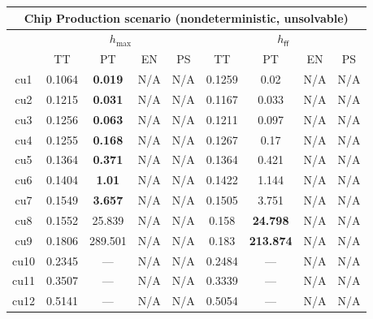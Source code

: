 \documentclass[landscape]{article}%
\begin{document}
%
\normalsize%
\begin{tabular}{||c||c|c|c|c|c|c|c|c||}%
\multicolumn{9}{c}{\textbf{Chip Production scenario (nondeterministic, unsolvable)}}\\%
\hline%
&\multicolumn{4}{||c||}{$h_{\max}$}&\multicolumn{4}{||c||}{$h_{\mathsf{ff}}$}\\%
\hline%
&\small{TT}&\small{PT}&\small{EN}&\small{PS}&\small{TT}&\small{PT}&\small{EN}&\small{PS}\\%
\hline%
\hline%
cu1&\small{0.1064}&\small{\textbf{0.019}}&\small{N/A}&\small{N/A}&\small{0.1259}&\small{0.02}&\small{N/A}&\small{N/A}\\%
\hline%
cu2&\small{0.1215}&\small{\textbf{0.031}}&\small{N/A}&\small{N/A}&\small{0.1167}&\small{0.033}&\small{N/A}&\small{N/A}\\%
\hline%
cu3&\small{0.1256}&\small{\textbf{0.063}}&\small{N/A}&\small{N/A}&\small{0.1211}&\small{0.097}&\small{N/A}&\small{N/A}\\%
\hline%
cu4&\small{0.1255}&\small{\textbf{0.168}}&\small{N/A}&\small{N/A}&\small{0.1267}&\small{0.17}&\small{N/A}&\small{N/A}\\%
\hline%
cu5&\small{0.1364}&\small{\textbf{0.371}}&\small{N/A}&\small{N/A}&\small{0.1364}&\small{0.421}&\small{N/A}&\small{N/A}\\%
\hline%
cu6&\small{0.1404}&\small{\textbf{1.01}}&\small{N/A}&\small{N/A}&\small{0.1422}&\small{1.144}&\small{N/A}&\small{N/A}\\%
\hline%
cu7&\small{0.1549}&\small{\textbf{3.657}}&\small{N/A}&\small{N/A}&\small{0.1505}&\small{3.751}&\small{N/A}&\small{N/A}\\%
\hline%
cu8&\small{0.1552}&\small{25.839}&\small{N/A}&\small{N/A}&\small{0.158}&\small{\textbf{24.798}}&\small{N/A}&\small{N/A}\\%
\hline%
cu9&\small{0.1806}&\small{289.501}&\small{N/A}&\small{N/A}&\small{0.183}&\small{\textbf{213.874}}&\small{N/A}&\small{N/A}\\%
\hline%
cu10&\small{0.2345}&\small{---}&\small{N/A}&\small{N/A}&\small{0.2484}&\small{---}&\small{N/A}&\small{N/A}\\%
\hline%
cu11&\small{0.3507}&\small{---}&\small{N/A}&\small{N/A}&\small{0.3339}&\small{---}&\small{N/A}&\small{N/A}\\%
\hline%
cu12&\small{0.5141}&\small{---}&\small{N/A}&\small{N/A}&\small{0.5054}&\small{---}&\small{N/A}&\small{N/A}\\%
\hline%
\end{tabular}%
\end{document}
